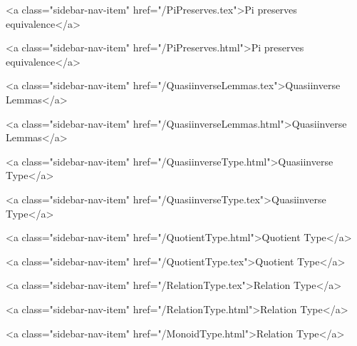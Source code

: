       
        
          <a class="sidebar-nav-item" href="/PiPreserves.tex">Pi preserves equivalence</a>
        
      
    
      
        
          <a class="sidebar-nav-item" href="/PiPreserves.html">Pi preserves equivalence</a>
        
      
    
      
        
          <a class="sidebar-nav-item" href="/QuasiinverseLemmas.tex">Quasiinverse Lemmas</a>
        
      
    
      
        
          <a class="sidebar-nav-item" href="/QuasiinverseLemmas.html">Quasiinverse Lemmas</a>
        
      
    
      
        
          <a class="sidebar-nav-item" href="/QuasiinverseType.html">Quasiinverse Type</a>
        
      
    
      
        
          <a class="sidebar-nav-item" href="/QuasiinverseType.tex">Quasiinverse Type</a>
        
      
    
      
        
          <a class="sidebar-nav-item" href="/QuotientType.html">Quotient Type</a>
        
      
    
      
        
          <a class="sidebar-nav-item" href="/QuotientType.tex">Quotient Type</a>
        
      
    
      
        
          <a class="sidebar-nav-item" href="/RelationType.tex">Relation Type</a>
        
      
    
      
        
          <a class="sidebar-nav-item" href="/RelationType.html">Relation Type</a>
        
      
    
      
        
          <a class="sidebar-nav-item" href="/MonoidType.html">Relation Type</a>
        
